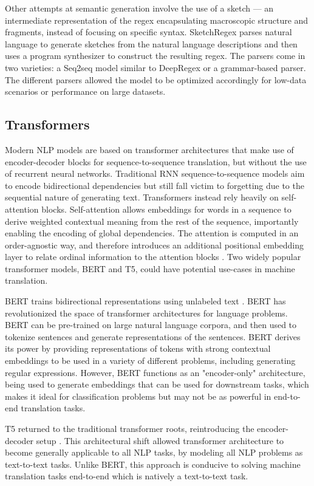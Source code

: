 \documentclass[11pt,a4paper]{article}
\begin{document}
Other attempts at semantic generation involve the use of a sketch --- an intermediate representation of the regex encapsulating macroscopic structure and fragments, instead of focusing on specific syntax. SketchRegex \cite{sketchregex} parses natural language to generate sketches from the natural language descriptions and then uses a program synthesizer to construct the resulting regex. The parsers come in two varieties: a Seq2seq model similar to DeepRegex or a grammar-based parser. The different parsers allowed the model to be optimized accordingly for low-data scenarios or performance on large datasets.

\subsection*{Transformers}
Modern NLP models are based on transformer architectures \cite{Vaswani:2017} that make use of encoder-decoder blocks for sequence-to-sequence translation, but without the use of recurrent neural networks. Traditional RNN sequence-to-sequence models aim to encode bidirectional dependencies but still fall victim to forgetting due to the sequential nature of generating text.  Transformers instead rely heavily on self-attention blocks. Self-attention allows embeddings for words in a sequence to derive weighted contextual meaning from the rest of the sequence, importantly enabling the encoding of global dependencies. The attention is computed in an order-agnostic way, and therefore introduces an additional positional embedding layer to relate ordinal information to the attention blocks \cite{2020t5}. Two widely popular transformer models, BERT and T5, could have potential use-cases in machine translation.

BERT trains bidirectional representations using unlabeled text \cite{devlin-etal-2019-bert}. BERT has revolutionized the space of transformer architectures for language problems. BERT can be pre-trained on large natural language corpora, and then used to tokenize sentences and generate representations of the sentences. BERT derives its power by providing representations of tokens with strong contextual embeddings to be used in a variety of different problems, including generating regular expressions. However, BERT functions as an "encoder-only" architecture, being used to generate embeddings that can be used for downstream tasks, which makes it ideal for classification problems but may not be as powerful in end-to-end translation tasks.

T5 returned to the traditional transformer roots, reintroducing the encoder-decoder setup \cite{2020t5}. This architectural shift allowed transformer architecture to become generally applicable to all NLP tasks, by modeling all NLP problems as text-to-text tasks. Unlike BERT, this approach is conducive to solving machine translation tasks end-to-end which is natively a text-to-text task.
\end{document}
